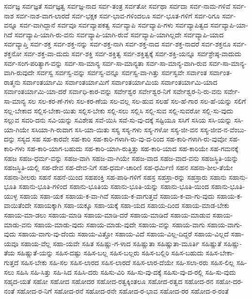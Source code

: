 {ಸರ್ವಜ್ಞ
ಸರ್ವಜ್ಞತೆ
ಸರ್ವಜ್ಞತ್ವ
ಸರ್ವಜ್ಞ-ನಾದ
ಸರ್ವ-ತಂತ್ರ
ಸರ್ವತೋ
ಸರ್ವಥಾ
ಸರ್ವದಾ
ಸರ್ವ-ನಾಮ-ಗಳಿವೆ
ಸರ್ವ-ನಾಶ
ಸರ್ವ-ನಾಶ-ವಾಗ-ಲಾರದೆ
ಸರ್ವ-ಭಕ್ಷಕ
ಸರ್ವ-ಭಾವ-ಗಳಿಂದಲೂ
ಸರ್ವ-ಭೂತ-ಗಳಿಗೆ
ಸರ್ವ-ರಿಗೂ
ಸರ್ವ-ವನ್ನೂ
ಸರ್ವ-ವಾಗಿದ್ದಾನೆ
ಸರ್ವವೂ
ಸರ್ವವ್ಯಾಪಕತ್ವ
ಸರ್ವವ್ಯಾಪಿ
ಸರ್ವವ್ಯಾಪಿ-ಗಳು
ಸರ್ವವ್ಯಾಪಿತ್ವದ
ಸರ್ವವ್ಯಾಪಿ-ಯಾ-ಗಿದೆ
ಸರ್ವವ್ಯಾಪಿ-ಯಾಗಿ-ರು-ವನು
ಸರ್ವವ್ಯಾಪಿ-ಯಾಗಿ-ರುವೆ
ಸರ್ವವ್ಯಾಪಿ-ಯಾಗಿಲ್ಲದೇ
ಸರ್ವವ್ಯಾಪಿ-ಯಾದ
ಸರ್ವವ್ಯಾಪ್ತಿ
ಸರ್ವ-ಶಕ್ತ
ಸರ್ವ-ಶಕ್ತ-ನನ್ನು
ಸರ್ವ-ಶಕ್ತ-ನಾಗಿ
ಸರ್ವ-ಶಕ್ತ-ನಾದ
ಸರ್ವ-ಶಕ್ತ-ನಾದರೆ
ಸರ್ವ-ಶಕ್ತನೂ
ಸರ್ವ-ಶಕ್ತನೋ
ಸರ್ವ-ಶಕ್ತ-ವಾ-ದುದು
ಸರ್ವ-ಶಕ್ತಿ
ಸರ್ವ-ಶಕ್ತಿತ್ವ
ಸರ್ವ-ಶಕ್ತಿತ್ವಕ್ಕೆ
ಸರ್ವ-ಶಕ್ತಿ-ಯನ್ನೂ
ಸರ್ವಶ್ರೇಷ್ಠ-ವಾದುದು
ಸರ್ವ-ಸಂಗ-ಪರಿತ್ಯಾಗ-ವನ್ನು
ಸರ್ವ-ಸಾ-ಮಾನ್ಯ
ಸರ್ವ-ಸಾ-ಮಾನ್ಯತಾ
ಸರ್ವ-ಸಾ-ಮಾನ್ಯ-ವಾಗಿ-ರುವ
ಸರ್ವ-ಸಾ-ಮಾನ್ಯ-ವಾಗಿ-ರುವುದೇ
ಸರ್ವಸ್ವ
ಸರ್ವಸ್ವ-ವನ್ನು
ಸರ್ವಸ್ವ-ವನ್ನೂ
ಸರ್ವಸ್ವ-ವಾ-ಗಿತ್ತು
ಸರ್ವಸ್ವವೇ
ಸರ್ವಾಂತ
ಸರ್ವಾಂತ-ರಾತ್ಮನು
ಸರ್ವಾಂತರ್ಯಾಮಿ
ಸರ್ವಾಂತರ್ಯಾಮಿಗೆ
ಸರ್ವಾಂತರ್ಯಾಮಿಯ
ಸರ್ವಾಂತರ್ಯಾಮಿ-ಯಾದ
ಸರ್ವಾಂತರ್ಯಾಮಿ-ಯಾ-ದರೆ
ಸರ್ವಾಧಿ-ಕಾರ-ವನ್ನು
ಸರ್ವೇಶ್ವರ
ಸರ್ವೇಶ್ವರ-ನಿಗೆ
ಸರ್ವೇಶ್ವರ-ನಿ-ರು-ವನು
ಸರ್ವೇ-ಸಾ-ಮಾನ್ಯ
ಸಲ
ಸಲ-ಕರ-ಣೆ-ಗಳು
ಸಲ-ಕರ-ಣೆಯ
ಸಲ-ವಲ್ಲ
ಸಲ-ಹುವ
ಸಲಹೆ
ಸಲ-ಹೆ-ಗಾರ
ಸಲ-ಹೆ-ಯನ್ನು
ಸಲಿಗೆ
ಸಲ್ಲ-ಬೇಕಾದ
ಸಲ್ಲಿಸ-ಬೇಕಾ-ಯಿತು
ಸಲ್ಲಿಸ-ಬೇಕು
ಸಲ್ಲಿ-ಸಲು
ಸಲ್ಲಿಸಿ
ಸಲ್ಲಿ-ಸುವ
ಸಲ್ಲಿ-ಸುವರೋ
ಸಲ್ಲಿ-ಸು-ವುದು
ಸಲ್ಲುವ
ಸವರಿ-ದನು
ಸವಿ-ಯನ್ನು
ಸವಿಶೇಷ
ಸವೆ-ಯಿಸಿ
ಸವೆ-ಸು-ವು-ದಕ್ಕೆ
ಸಷ್ಟಿಯೂ
ಸಸಿಗೆ
ಸಸಿಯ
ಸಸಿ-ಯನ್ನು
ಸಸಿ-ಯಾ-ಗಿಯೇ
ಸಸಿಯಾ-ಗಿ-ರುವಾಗ
ಸಸಿ-ಯಾ-ಯಿತು
ಸಸ್ಯ
ಸಸ್ಯ-ಗಳು
ಸಸ್ಯ-ಗಳೋ
ಸಸ್ಯ-ಜೀ-ವನ
ಸಸ್ಯ-ಜೀವ-ನ-ವೆಂಬು-ದನ್ನು
ಸಸ್ಯದ
ಸಹ
ಸಹ-ಕಾರವೇ
ಸಹ-ಕಾರಿ
ಸಹ-ಕಾರಿ-ಗಳಾಗಿ-ರು-ವು-ದ-ರಿಂದ
ಸಹ-ಕಾರಿ-ಗಳಾಗಿ-ರು-ವುವೋ
ಸಹ-ಕಾರಿ-ಗಳು
ಸಹ-ಕಾರಿ-ಯಾಗ-ಬಹುದು
ಸಹ-ಕಾರಿ-ಯಾಗಿ-ರುತ್ತಿತ್ತು
ಸಹ-ಕಾರಿ-ಯಾದ
ಸಹ-ಕಾರಿಯೇ
ಸಹ-ಗಮನಕ್ಕೆ
ಸಹಜ
ಸಹಜ-ಧರ್ಮ-ವನ್ನು
ಸಹಜ-ವಾಗಿ
ಸಹಜ-ವಾ-ಗಿಯೇ
ಸಹಜ-ವಾದ
ಸಹಜ-ವಾದ-ವನು
ಸಹಜಸ್ಥಿತಿ-ಯನ್ನು
ಸಹಜಸ್ಥಿತಿ-ಯಲ್ಲಿ
ಸಹ-ದೇವ
ಸಹ-ದೇವ-ನಿಗೆ
ಸಹ-ಧರ್ಮ-ಚಾರಿಣಿ
ಸಹ-ಧರ್ಮಿಣಿ
ಸಹನ
ಸಹನಾ-ಶೀಲ-ತೆಯೇ
ಸಹನಾ-ಶೀಲರು
ಸಹನೆ
ಸಹನೆ-ಯಿಂದ
ಸಹಪಂಕ್ತಿ
ಸಹ-ಪಾಠಿ-ಗಳಿಗೆ
ಸಹಸ್ರ
ಸಹಸ್ರಾ-ರನ್ನು
ಸಹಸ್ರಾರು
ಸಹಾನು
ಸಹಾನು-ಭೂತಿ
ಸಹಾನು-ಭೂತಿ-ಗಳಿಂದ
ಸಹಾನು-ಭೂತಿಯ
ಸಹಾನು-ಭೂತಿ-ಯನ್ನು
ಸಹಾನು-ಭೂತಿ-ಯಿಂದ
ಸಹಾನು-ಭೂತಿ-ಯುಳ್ಳ
ಸಹಾಯ
ಸಹಾ-ಯಕ
ಸಹಾಯ-ಕ-ವಾ-ಗಿವೆ
ಸಹಾಯ-ಕ-ವಾಗುತ್ತವೆ
ಸಹಾಯ-ಕ-ವಾ-ಗು-ವುದು
ಸಹಾಯ-ಕ-ವಾಯಿತೆಂದೇ
ಸಹಾಯಕ್ಕಾಗಿ
ಸಹಾ-ಯಕ್ಕೂ
ಸಹಾ-ಯಕ್ಕೆ
ಸಹಾ-ಯದ
ಸಹಾಯ-ದಿಂದ
ಸಹಾಯ-ಮಾಡ-ಬೇಕು
ಸಹಾಯ-ಮಾ-ಡಲು
ಸಹಾಯ-ಮಾಡಿ
ಸಹಾಯ-ಮಾಡಿ-ದರೆ
ಸಹಾಯ-ಮಾಡಿದೆ
ಸಹಾಯ-ಮಾಡುವ
ಸಹಾಯ-ಮಾಡು-ವನು
ಸಹಾಯ-ಮಾಡು-ವುದು
ಸಹಾಯ-ಮಾಡು-ವುದೇ
ಸಹಾಯ-ವನ್ನು
ಸಹಾಯ-ವಾಗು
ಸಹಾಯ-ವಾಗು-ವುದು
ಸಹಾಯ-ವಾಗು-ವು-ದೆಂದು
ಸಹಾಯ-ವಿತ್ತೋ
ಸಹಾಯ-ವಿದೆ
ಸಹಾಯ-ವಿಲ್ಲ-ದಿದ್ದರೆ
ಸಹಾಯ-ವಿಲ್ಲದೆ
ಸಹಾ-ಯವೂ
ಸಹಾಯ-ವೆಲ್ಲ
ಸಹಾ-ಯವೇ
ಸಹಿತ
ಸಹಿಷ್ಣು-ಗ-ಳಾದ
ಸಹಿಷ್ಣುತಾ
ಸಹಿಷ್ಣುತಾ-ಮೂರ್ತಿ
ಸಹಿಷ್ಣುತೆ
ಸಹಿಷ್ಣು-ತೆಯ
ಸಹಿಷ್ಣುತೆ-ಯನ್ನು
ಸಹಿಸ-ದಷ್ಟು
ಸಹಿಸ-ಬಲ್ಲ
ಸಹಿಸ-ಬಲ್ಲರು
ಸಹಿಸ-ಬಲ್ಲಿರಿ
ಸಹಿಸ-ಬಹುದು
ಸಹಿಸ-ಬೇಕಾ-ಗುತ್ತದೆ
ಸಹಿಸ-ಬೇಕು
ಸಹಿ-ಸಲ
ಸಹಿಸ-ಲಾರದ
ಸಹಿಸ-ಲಾರದೆ
ಸಹಿಸ-ಲಾರ-ದೆಯೇ
ಸಹಿ-ಸಲಾ-ರರು
ಸಹಿಸ-ಲಿಲ್ಲ
ಸಹಿ-ಸಲು
ಸಹಿಸಿ
ಸಹಿ-ಸಿತ್ತು
ಸಹಿ-ಸಿದ
ಸಹಿಸಿ-ದರು
ಸಹಿಸು-ವಿರಿ
ಸಹಿ-ಸು-ವು-ದಕ್ಕೆ
ಸಹಿಸು-ವು-ದ-ರಲ್ಲಿ
ಸಹಿ-ಸು-ವುದು
ಸಹೃದ-ಯತೆ
ಸಹೋ
ಸಹೋದ
ಸಹೋದರ
ಸಹೋದ-ರತ್ವಕ್ಕಿಂತಲೂ
ಸಹೋದ-ರತ್ವದ
ಸಹೋದ-ರನ
ಸಹೋ-ದರ-ನಂತೆ
ಸಹೋದ-ರ-ನಿಗೆ
ಸಹೋದ-ರನೆ
ಸಹೋದ-ರನೇ
ಸಹೋದ-ರ-ಭಾವ
ಸಹೋದ-ರರ
ಸಹೋದ-ರ-ರಂತೆ
}
